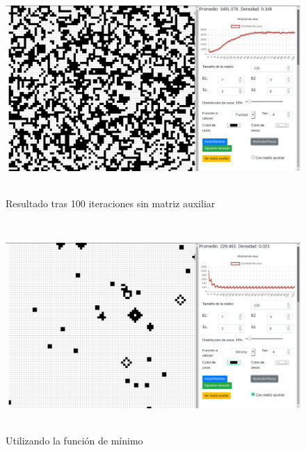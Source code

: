 \documentclass[12pt, titlepage]{article}
\begin{document}
\begin{figure}[H]
\begin{center}
 \includegraphics[width=15cm, height=8cm]{./img/2336.png}
 \caption{Resultado tras 100 iteraciones sin matriz auxiliar}
 \label{fig:2336}
\end{center}
\end{figure}

\begin{figure}[H]
\begin{center}
 \includegraphics[width=15cm, height=8cm]{./img/2336-min.png}
 \caption{Utilizando la función de mínimo}
 \label{fig:2336-min}
\end{center}
\end{figure}
\end{document}
